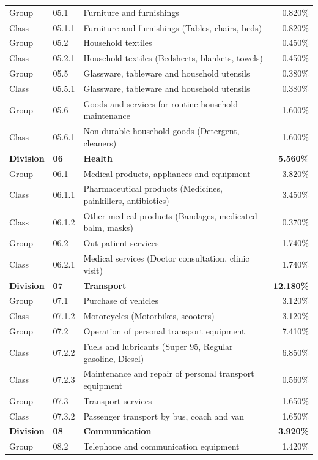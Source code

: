 \documentclass[11pt,a4paper]{article}
\begin{document}
\begin{longtable}{llp{7.5cm}r}
Group & 05.1 & Furniture and furnishings & 0.820\% \\
Class & 05.1.1 & Furniture and furnishings (Tables, chairs, beds) & 0.820\% \\
Group & 05.2 & Household textiles & 0.450\% \\
Class & 05.2.1 & Household textiles (Bedsheets, blankets, towels) & 0.450\% \\
Group & 05.5 & Glassware, tableware and household utensils & 0.380\% \\
Class & 05.5.1 & Glassware, tableware and household utensils & 0.380\% \\
Group & 05.6 & Goods and services for routine household maintenance & 1.600\% \\
Class & 05.6.1 & Non-durable household goods (Detergent, cleaners) & 1.600\% \\
\midrule
\textbf{Division} & \textbf{06} & \textbf{Health} & \textbf{5.560\%} \\
Group & 06.1 & Medical products, appliances and equipment & 3.820\% \\
Class & 06.1.1 & Pharmaceutical products (Medicines, painkillers, antibiotics) & 3.450\% \\
Class & 06.1.2 & Other medical products (Bandages, medicated balm, masks) & 0.370\% \\
Group & 06.2 & Out-patient services & 1.740\% \\
Class & 06.2.1 & Medical services (Doctor consultation, clinic visit) & 1.740\% \\
\midrule
\textbf{Division} & \textbf{07} & \textbf{Transport} & \textbf{12.180\%} \\
Group & 07.1 & Purchase of vehicles & 3.120\% \\
Class & 07.1.2 & Motorcycles (Motorbikes, scooters) & 3.120\% \\
Group & 07.2 & Operation of personal transport equipment & 7.410\% \\
Class & 07.2.2 & Fuels and lubricants (Super 95, Regular gasoline, Diesel) & 6.850\% \\
Class & 07.2.3 & Maintenance and repair of personal transport equipment & 0.560\% \\
Group & 07.3 & Transport services & 1.650\% \\
Class & 07.3.2 & Passenger transport by bus, coach and van & 1.650\% \\
\midrule
\textbf{Division} & \textbf{08} & \textbf{Communication} & \textbf{3.920\%} \\
Group & 08.2 & Telephone and communication equipment & 1.420\% \\

\end{longtable}
\end{document}
